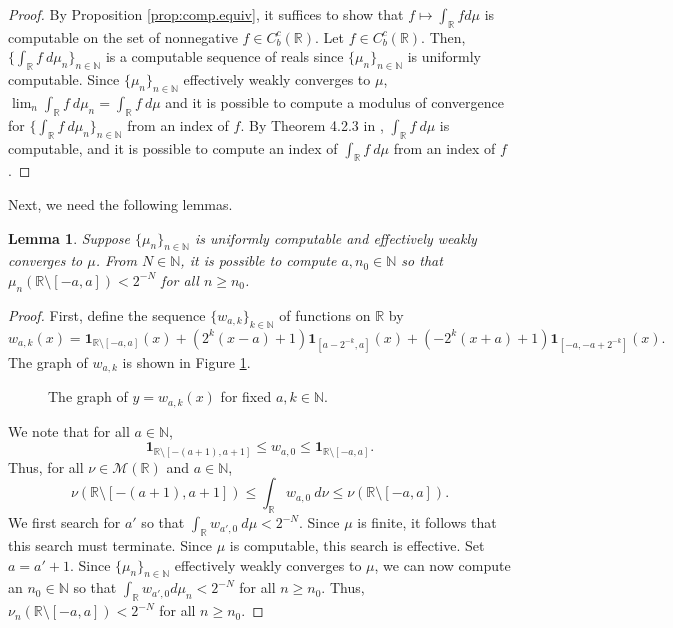 \documentclass{amsart}
\newcommand{\R}{\mathbb{R}}
\newcommand{\N}{\mathbb{N}}
\newcommand{\M}{\mathcal{M}}
\newcommand{\one}{\mathbf{1}}
\newtheorem{lemma}[theorem]{Lemma}
\theoremstyle{definition}
\numberwithin{equation}{section}
\begin{document}
\begin{proof}
By Proposition \ref{prop:comp.equiv}, it suffices to show that $f\mapsto\int_{\R}fd\mu$ is computable on the set of nonnegative $f\in C_b^c(\R)$.  Let $f \in C^c_b(\R)$.  Then, $\{\int_{\R}f\ d\mu_n\}_{n\in\N}$ is a computable sequence of reals since $\{\mu_n\}_{n\in\N}$ is uniformly computable.  
Since $\{\mu_n\}_{n \in \N}$ effectively weakly converges to $\mu$, $\lim_n \int_\R f\ d\mu_n = \int_\R f\ d\mu$ and it is possible to compute a modulus of convergence for 
$\{\int_{\R}f\ d\mu_n\}_{n\in\N}$ from an index of $f$.  By Theorem 4.2.3 in \cite{Weihrauch.2000}, $\int_\R f\ d\mu$ is computable, and it is possible to compute an index of $\int_\R f\ d\mu$ from an index of $f$.
\end{proof}

Next, we need the following lemmas.

\begin{lemma}\label{lm:big.a}
Suppose $\{\mu_n\}_{n \in \N}$ is uniformly computable and effectively weakly converges to $\mu$.  From $N \in \N$, it is possible to compute $a,n_0 \in \N$ so that $\mu_n(\R \setminus [-a,a]) < 2^{-N}$ for all $n \geq n_0$.
\end{lemma}

\begin{proof}
First, define the sequence $\{w_{a,k}\}_{k\in\N}$ of functions on $\R$ by
\[
w_{a,k}(x)=\one_{\R\setminus[-a,a]}(x)+(2^k(x-a)+1)\one_{[a-2^{-k},a]}(x)+(-2^k(x+a)+1)\one_{[-a,-a+2^{-k}]}(x).
\]
The graph of $w_{a,k}$ is shown in Figure \ref{fig:wak}.
\begin{figure}[h!]
    \centering
    \caption{The graph of $y=w_{a,k}(x)$ for fixed $a,k\in\N$. }
    \label{fig:wak}
\end{figure}

We note that for all $a \in \N$, 
\[
\one_{\R \setminus [-(a + 1), a + 1]} \leq w_{a,0} \leq \one_{\R \setminus [-a,a]}.
\]
Thus, for all $\nu \in \M(\R)$ and $a \in \N$, 
\[
\nu(\R \setminus [-(a + 1), a + 1])  \leq \int_\R w_{a,0}\ d\nu \leq \nu(\R \setminus [-a,a]).
\]
We first search for $a'$ so that $\int_\R w_{a',0}\ d\mu < 2^{-N}$.  Since $\mu$ is finite, it follows that 
this search must terminate.  Since $\mu$ is computable, this search is effective.  Set $a = a' + 1$.  Since 
$\{\mu_n\}_{n \in \N}$ effectively weakly converges to $\mu$, we can now compute an $n_0 \in \N$ so that 
$\int_\R w_{a',0} d\mu_n < 2^{-N}$ for all $n \geq n_0$.  Thus, 
$\nu_n(\R \setminus [-a,a]) < 2^{-N}$ for all $n \geq n_0$.
\end{proof}
\end{document}
